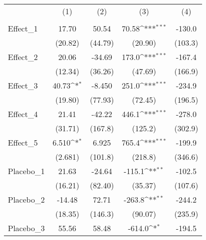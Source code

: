 {
\def\sym#1{\ifmmode^{#1}\else\(^{#1}\)\fi}
\begin{tabular}{l*{4}{c}}
\toprule
            &\multicolumn{1}{c}{(1)}&\multicolumn{1}{c}{(2)}&\multicolumn{1}{c}{(3)}&\multicolumn{1}{c}{(4)}\\
            &\multicolumn{1}{c}{} &\multicolumn{1}{c}{} &\multicolumn{1}{c}{} &\multicolumn{1}{c}{} \\
\midrule
Effect\_1    &       17.70         &       50.54         &       70.58\sym{***}&      -130.0         \\
            &     (20.82)         &     (44.79)         &     (20.90)         &     (103.3)         \\
\addlinespace
Effect\_2    &       20.06         &      -34.69         &       173.0\sym{***}&      -167.4         \\
            &     (12.34)         &     (36.26)         &     (47.69)         &     (166.9)         \\
\addlinespace
Effect\_3    &       40.73\sym{*}  &      -8.450         &       251.0\sym{***}&      -234.9         \\
            &     (19.80)         &     (77.93)         &     (72.45)         &     (196.5)         \\
\addlinespace
Effect\_4    &       21.41         &      -42.22         &       446.1\sym{***}&      -278.0         \\
            &     (31.71)         &     (167.8)         &     (125.2)         &     (302.9)         \\
\addlinespace
Effect\_5    &       6.510\sym{*}  &       6.925         &       765.4\sym{***}&      -199.9         \\
            &     (2.681)         &     (101.8)         &     (218.8)         &     (346.6)         \\
\addlinespace
Placebo\_1   &       21.63         &      -24.64         &      -115.1\sym{**} &      -102.5         \\
            &     (16.21)         &     (82.40)         &     (35.37)         &     (107.6)         \\
\addlinespace
Placebo\_2   &      -14.48         &       72.71         &      -263.8\sym{**} &      -244.2         \\
            &     (18.35)         &     (146.3)         &     (90.07)         &     (235.9)         \\
\addlinespace
Placebo\_3   &       55.56         &       58.48         &      -614.0\sym{*}  &      -194.5         \\

\end{tabular}}
